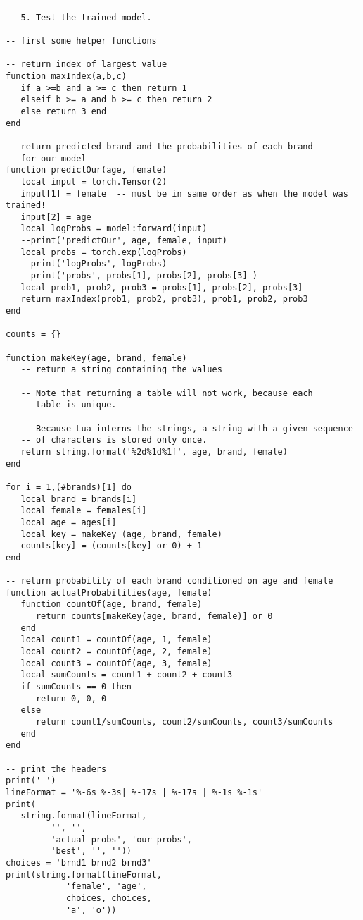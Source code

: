 \begin{verbatim}
----------------------------------------------------------------------
-- 5. Test the trained model.

-- first some helper functions

-- return index of largest value
function maxIndex(a,b,c)
   if a >=b and a >= c then return 1 
   elseif b >= a and b >= c then return 2
   else return 3 end
end

-- return predicted brand and the probabilities of each brand
-- for our model
function predictOur(age, female)
   local input = torch.Tensor(2)
   input[1] = female  -- must be in same order as when the model was trained!
   input[2] = age
   local logProbs = model:forward(input)  
   --print('predictOur', age, female, input)
   local probs = torch.exp(logProbs)
   --print('logProbs', logProbs)
   --print('probs', probs[1], probs[2], probs[3] )
   local prob1, prob2, prob3 = probs[1], probs[2], probs[3]
   return maxIndex(prob1, prob2, prob3), prob1, prob2, prob3
end
      
counts = {}

function makeKey(age, brand, female)
   -- return a string containing the values

   -- Note that returning a table will not work, because each
   -- table is unique.

   -- Because Lua interns the strings, a string with a given sequence
   -- of characters is stored only once.
   return string.format('%2d%1d%1f', age, brand, female)
end

for i = 1,(#brands)[1] do
   local brand = brands[i]
   local female = females[i]
   local age = ages[i]
   local key = makeKey (age, brand, female)
   counts[key] = (counts[key] or 0) + 1
end

-- return probability of each brand conditioned on age and female
function actualProbabilities(age, female)
   function countOf(age, brand, female)
      return counts[makeKey(age, brand, female)] or 0
   end
   local count1 = countOf(age, 1, female)
   local count2 = countOf(age, 2, female)
   local count3 = countOf(age, 3, female)
   local sumCounts = count1 + count2 + count3
   if sumCounts == 0 then
      return 0, 0, 0
   else
      return count1/sumCounts, count2/sumCounts, count3/sumCounts
   end
end

-- print the headers 
print(' ')
lineFormat = '%-6s %-3s| %-17s | %-17s | %-1s %-1s'
print(
   string.format(lineFormat,
		 '', '', 
		 'actual probs', 'our probs', 
		 'best', '', ''))
choices = 'brnd1 brnd2 brnd3'
print(string.format(lineFormat,
		    'female', 'age', 
		    choices, choices, 
		    'a', 'o'))


\end{verbatim}
